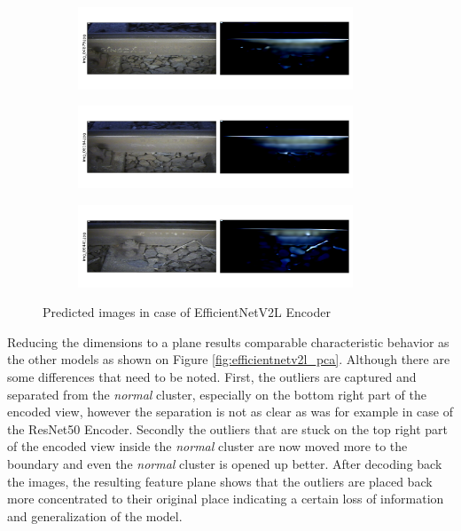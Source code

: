 \begin{figure}[H]
    \centering
    \begin{subfigure}{\textwidth}
        \centering
        \includegraphics[width=0.9\textwidth,trim={0 1cm 0 1cm},clip]{./results/efficientnetv2l_vgg19/20230525_194238_predict_0.png}
    \end{subfigure}
    \begin{subfigure}{\textwidth}
        \centering
        \includegraphics[width=0.9\textwidth,trim={0 1cm 0 1cm},clip]{./results/efficientnetv2l_vgg19/20230525_194238_predict_1.png}
    \end{subfigure}
    \begin{subfigure}{\textwidth}
        \centering
        \includegraphics[width=0.9\textwidth,trim={0 1cm 0 1cm},clip]{./results/efficientnetv2l_vgg19/20230525_194238_predict_2.png}
    \end{subfigure}
    \caption{Predicted images in case of EfficientNetV2L Encoder}
    \label{fig:efficientnetv2l_examples}
\end{figure}

Reducing the dimensions to a plane results comparable characteristic behavior as the other models
as shown on Figure \ref{fig:efficientnetv2l_pca}.
Although there are some differences that need to be noted.
First, the outliers are captured and separated from the \emph{normal} cluster, especially on the
bottom right part of the encoded view, however the separation is not as clear as was for example
in case of the ResNet50 Encoder.
Secondly the outliers that are stuck on the top right part of the encoded view inside the \emph{normal}
cluster are now moved more to the boundary and even the \emph{normal} cluster is opened up better.
After decoding back the images, the resulting feature plane shows that the outliers are placed back
more concentrated to their original place indicating a certain loss of information
and generalization of the model.

